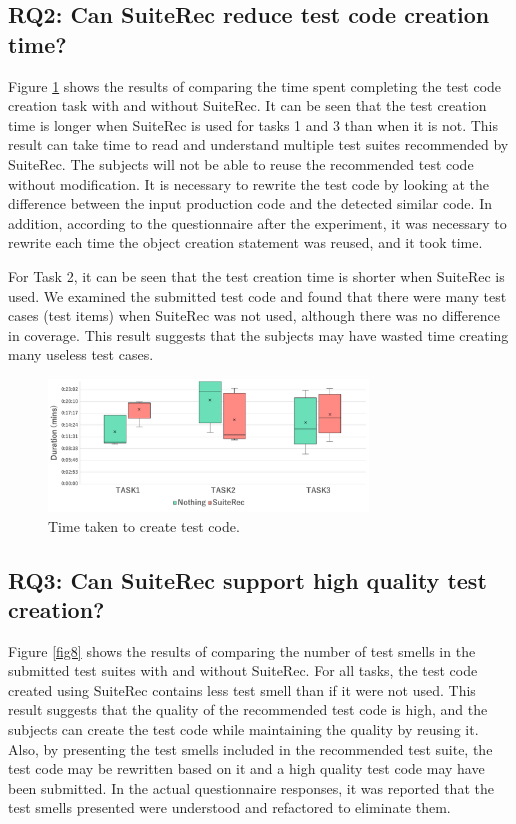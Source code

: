 \documentclass[conference]{IEEEtran}
\begin{document}
\subsection{RQ2: Can SuiteRec reduce test code creation time?}
Figure \ref{fig7} shows the results of comparing the time spent completing the test code creation task with and without SuiteRec. It can be seen that the test creation time is longer when SuiteRec is used for tasks 1 and 3 than when it is not. This result can take time to read and understand multiple test suites recommended by SuiteRec. The subjects will not be able to reuse the recommended test code without modification. It is necessary to rewrite the test code by looking at the difference between the input production code and the detected similar code. In addition, according to the questionnaire after the experiment, it was necessary to rewrite each time the object creation statement was reused, and it took time.

For Task 2, it can be seen that the test creation time is shorter when SuiteRec is used. We examined the submitted test code and found that there were many test cases (test items) when SuiteRec was not used, although there was no difference in coverage. This result suggests that the subjects may have wasted time creating many useless test cases.

\begin{figure}[htbp]
\centerline{\includegraphics[width=8.5cm]{duration.pdf}}
\caption{Time taken to create test code.}
\label{fig7}
\end{figure}

\subsection{RQ3: Can SuiteRec support high quality test creation?}
Figure \ref{fig8} shows the results of comparing the number of test smells in the submitted test suites with and without SuiteRec. For all tasks, the test code created using SuiteRec contains less test smell than if it were not used. This result suggests that the quality of the recommended test code is high, and the subjects can create the test code while maintaining the quality by reusing it. Also, by presenting the test smells included in the recommended test suite, the test code may be rewritten based on it and a high quality test code may have been submitted. In the actual questionnaire responses, it was reported that the test smells presented were understood and refactored to eliminate them.
\end{document}
